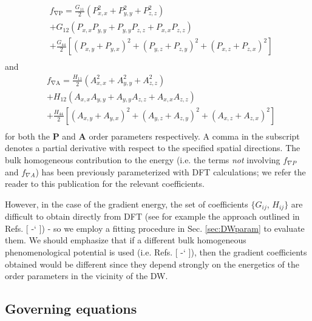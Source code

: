 \documentclass[%
 reprint,
superscriptaddress,
 amsmath,amssymb,
prb,
]{revtex4-1}
\newcommand*{\citen}[1]{%
  \begingroup
    \romannumeral-`\x %
    \setcitestyle{numbers}%
    \cite{#1}%
  \endgroup   
}
\begin{document}
\begin{align}\label{eqn:gradP}
&f_\mathrm{\nabla P} =\frac{G_{11}}{2}  \left( P_{x,x}^2 + P_{y,y}^2 + P_{z,z}^2 \right) \\ \nonumber
&+  G_{12}  \left(P_{x,x} P_{y,y} + P_{y,y} P_{z,z} + P_{x,x} P_{z,z} \right) \\ \nonumber
&+ \frac{G_{44}}{2} \left[\left(P_{x,y} + P_{y,x} \right)^2+ \left(P_{y,z} + P_{z,y} \right)^2 + \left(P_{x,z} + P_{z,x}\right)^2\right]\\ \nonumber
\end{align}
%
and
%
\begin{align}\label{eqn:gradA}
&f_\mathrm{\nabla A} =\frac{H_{11}}{2}   \left( A_{x,x}^2 + A_{y,y}^2 + A_{z,z}^2 \right) \\ \nonumber
&+  H_{12}  \left(A_{x,x} A_{y,y} + A_{y,y} A_{z,z} + A_{x,x} A_{z,z} \right) \\ \nonumber
&+ \frac{H_{44}}{2} \left[\left(A_{x,y} + A_{y,x} \right)^2+ \left(A_{y,z} + A_{z,y} \right)^2 + \left(A_{x,z} + A_{z,x}\right)^2\right]\\ \nonumber
\end{align}
%
for both the $\mathbf{P}$ and $\mathbf{A}$ order parameters respectively.
%
A comma in the subscript denotes a partial derivative with respect to the specified spatial directions.
%
The bulk homogeneous contribution to the energy (i.e. the terms \emph{not} involving $f_{\nabla P}$ and $f_{\nabla A}$) has been previously parameterized with DFT calculations\cite{Fedorova2022}; we refer the reader to this publication for the relevant coefficients.
%
%

%
However, in the case of the gradient energy, the set of coefficients $\{ G_{ij}$, $H_{ij} \}$ are difficult to obtain directly from DFT (see for example the approach outlined in Refs. [\citen{Stengel2013, Stengel2016, Dieguez2022}]) - so we employ a fitting procedure in Sec. \ref{sec:DWparam} to evaluate them.
%
We should emphasize that if a different bulk homogeneous phenomenological potential is used (i.e. Refs. [\citen{Karpinsky2017, Marton2017, Xue2021}]), then the gradient coefficients obtained would be different since they depend strongly on the energetics of the order parameters in the vicinity of the DW.

%
\subsection{Governing equations}\label{sec:FEgov}
%
\end{document}
